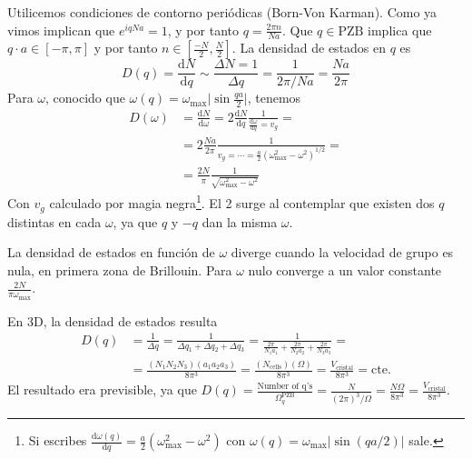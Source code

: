 Utilicemos condiciones de contorno periódicas (Born-Von Karman). Como
ya vimos implican que $e^{iqNa}=1$, y por tanto
$q = \frac{2\pi n}{Na}$. Que $q\in \text{PZB}$ implica que
$q\cdot a \in [-\pi, \pi]$ y por tanto
$n \in \left[ \frac{-N}{2}, \frac{N}{2} \right]$. La densidad de
estados en $q$ es
\begin{equation}
  D(q) = \frac{\text{d}N}{\text{d}q} \sim \frac{\Delta N = 1}{\Delta q}= \frac{1}{2\pi / Na} = \frac{Na}{2\pi}
\end{equation}
Para $\omega$, conocido que $\omega(q) = \omega_\text{max} \lvert \sin
\frac{qa}{2}\vert$, tenemos
\begin{equation}
\begin{split}
  D(\omega) &= \frac{\text{d}N}{\text{d}\omega} = 2
  \frac{\text{d}N}{\text{d}q}
  \frac{1}{\frac{\text{d}\omega}{\text{d}q} = v_g} =\\
            &= 2 \frac{Na}{2\pi}\frac{1}{v_g = \cdots =
  \frac{a}{2}(\omega_\text{max}^2 - \omega^2)^{1/2}} = \\
            &= \frac{2N}{\pi} \frac{1}{\sqrt{\omega_\text{max}^2 - \omega^2}}
\end{split}
\end{equation}
Con $v_g$ calculado por magia negra\footnote{Si escribes
$\frac{\text{d}\omega(q)}{\text{d}q} = \frac{a}{2}(\omega_\text{max}^2
- \omega^2)$ con $\omega(q) = \omega_\text{max} |\sin(qa/2)|$ sale.}.  El
2 surge al contemplar que existen dos $q$ distintas en cada $\omega$, ya
que $q$ y $-q$ dan la misma $\omega$.

La densidad de estados en función de $\omega$ diverge cuando la
velocidad de grupo es nula, en primera zona de Brillouin. Para
$\omega$ nulo converge a un valor constante $\frac{2N}{\pi \omega_\text{max}}$.

En 3D, la densidad de estados resulta
\begin{equation}
\begin{split}
  D(q) &= \frac{1}{\Delta q} = \frac{1}{\Delta q_1 + \Delta q_2 +
    \Delta q_3} = \frac{1}{\frac{2\pi}{N_1 a_1} +  \frac{2\pi}{N_2
      a_2} + \frac{2\pi}{N_3 a_3} } = \\ &= \frac{(N_1 N_2 N_3)(a_1 a_2
         a_3)}{8\pi^3} = \frac{(N_\text{cells})(\Omega)}{8\pi^3} =
                                           \frac{V_\text{cristal}}{8\pi^3}
                                           = \text{cte.}
\end{split}
\end{equation}
El resultado era previsible, ya que
$D(q) =\frac{\text{Number of q's}}{\Omega_q^\text{PZB}} =
\frac{N}{(2\pi)^3/ \Omega} = \frac{N\Omega}{8\pi^3} =
\frac{V_\text{cristal}}{8\pi^3}$.

